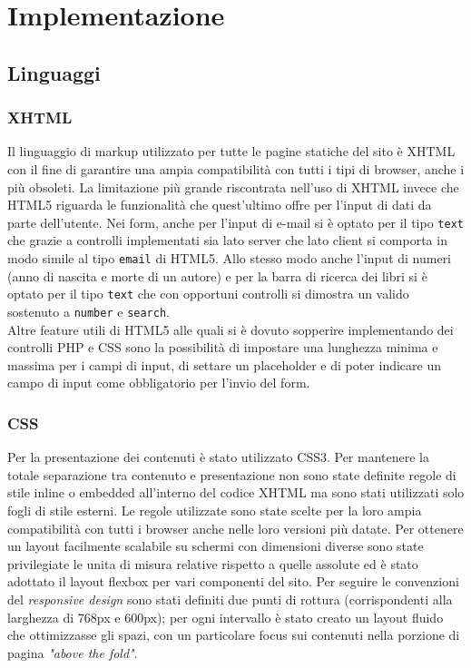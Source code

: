 \documentclass[12pt,a4paper,headings=optiontohead]{article}
\begin{document}
	\newpage
	\section{Implementazione}
	\subsection{Linguaggi}
	\subsubsection{XHTML}
	Il linguaggio di markup utilizzato per tutte le pagine statiche del sito è XHTML con il fine di garantire una ampia compatibilità con tutti i tipi di browser, anche i più obsoleti. La limitazione più grande riscontrata nell'uso di XHTML invece che HTML5 riguarda le funzionalità che quest'ultimo offre per l'input di dati da parte dell'utente. Nei form, anche per l'input di e-mail si è optato per il tipo \texttt{text} che grazie a controlli implementati sia lato server che lato client si comporta in modo simile al tipo \texttt{email} di HTML5. Allo stesso modo anche l'input di numeri (anno di nascita e morte di un autore) e per la barra di ricerca dei libri si è optato per il tipo \texttt{text} che con opportuni controlli si dimostra un valido sostenuto a \texttt{number} e \texttt{search}. \\
	Altre feature utili di HTML5 alle quali si è dovuto sopperire implementando dei controlli PHP e CSS sono la possibilità di impostare una lunghezza minima e massima per i campi di input, di settare un placeholder e di poter indicare un campo di input come obbligatorio per l'invio del form.
	
	\subsubsection{CSS}
	Per la presentazione dei contenuti è stato utilizzato CSS3. Per mantenere la totale separazione tra contenuto e presentazione non sono state definite regole di stile inline o embedded all'interno del codice XHTML ma sono stati utilizzati solo fogli di stile esterni. Le regole utilizzate sono state scelte per la loro ampia compatibilità con tutti i browser anche nelle loro versioni più datate. Per ottenere un layout facilmente scalabile su schermi con dimensioni diverse sono state privilegiate le unita di misura relative rispetto a quelle assolute ed è stato adottato il layout flexbox per vari componenti del sito. Per seguire le convenzioni del \textit{responsive design} sono stati definiti due punti di rottura (corrispondenti alla larghezza di 768px%
	e 600px); %
	per ogni intervallo è stato creato un layout fluido che ottimizzasse gli spazi, con un particolare focus sui contenuti nella porzione di pagina \textit{"above the fold"}.
	
\end{document}
